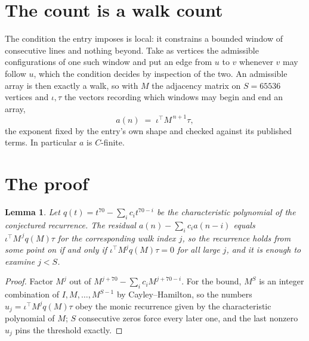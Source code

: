 \documentclass[11pt,a4paper]{article}
\theoremstyle{plain}
\newtheorem{lemma}[theorem]{Lemma}
\theoremstyle{definition}
\begin{document}
\section{The count is a walk count}

The condition the entry imposes is local: it constrains a bounded window of consecutive lines and nothing beyond. Take as
vertices the admissible configurations of one such window and put an edge from $u$ to $v$
whenever $v$ may follow $u$, which the condition decides by inspection of the two. An
admissible array is then exactly a walk, so with $M$ the adjacency matrix on $S=65536$ vertices
and $\iota,\tau$ the vectors recording which windows may begin and end an array,
\[
a(n)\;=\;\iota^{\!\top}M^{\,n+1}\tau ,
\]
the exponent fixed by the entry's own shape and checked against its published terms. In
particular $a$ is $C$-finite.

\section{The proof}

\begin{lemma}\label{lem:crit}
Let $q(t)=t^{70}-\sum_i c_it^{70-i}$ be the characteristic polynomial of the
conjectured recurrence. The residual $a(n)-\sum_ic_ia(n-i)$ equals
$\iota^{\!\top}M^{\,j}q(M)\tau$ for the corresponding walk index $j$, so the recurrence
holds from some point on if and only if $\iota^{\!\top}M^{j}q(M)\tau=0$ for all large $j$,
and it is enough to examine $j<S$.
\end{lemma}

\begin{proof}
Factor $M^{j}$ out of $M^{j+70}-\sum_ic_iM^{j+70-i}$. For the bound, $M^{S}$
is an integer combination of $I,M,\dots,M^{S-1}$ by Cayley--Hamilton, so the numbers
$u_j=\iota^{\!\top}M^{j}q(M)\tau$ obey the monic recurrence given by the characteristic
polynomial of $M$; $S$ consecutive zeros force every later one, and the last nonzero $u_j$
pins the threshold exactly.
\end{proof}
\end{document}
